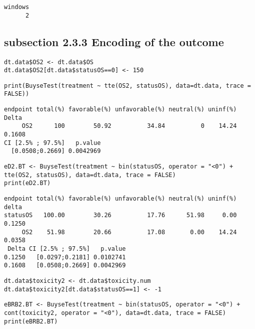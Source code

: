 \documentclass[12pt]{article}
\begin{document}
\begin{verbatim}
windows 
      2
\end{verbatim}

\subsection{subsection 2.3.3 Encoding of the outcome}
\label{sec:org54c6530}
\lstset{language=r,label= ,caption= ,captionpos=b,numbers=none}
\begin{lstlisting}
dt.data$OS2 <- dt.data$OS
dt.data$OS2[dt.data$statusOS==0] <- 150
\end{lstlisting}

\lstset{language=r,label= ,caption= ,captionpos=b,numbers=none}
\begin{lstlisting}
print(BuyseTest(treatment ~ tte(OS2, statusOS), data=dt.data, trace = FALSE))
\end{lstlisting}

\begin{verbatim}
endpoint total(%) favorable(%) unfavorable(%) neutral(%) uninf(%)  Delta
     OS2      100        50.92          34.84          0    14.24 0.1608
CI [2.5% ; 97.5%]   p.value
  [0.0508;0.2669] 0.0042969
\end{verbatim}



\lstset{language=r,label= ,caption= ,captionpos=b,numbers=none}
\begin{lstlisting}
eD2.BT <- BuyseTest(treatment ~ bin(statusOS, operator = "<0") + tte(OS2, statusOS), data=dt.data, trace = FALSE)
print(eD2.BT)
\end{lstlisting}

\begin{verbatim}
endpoint total(%) favorable(%) unfavorable(%) neutral(%) uninf(%)  delta
statusOS   100.00        30.26          17.76      51.98     0.00 0.1250
     OS2    51.98        20.66          17.08       0.00    14.24 0.0358
 Delta CI [2.5% ; 97.5%]   p.value
0.1250   [0.0297;0.2181] 0.0102741
0.1608   [0.0508;0.2669] 0.0042969
\end{verbatim}



\lstset{language=r,label= ,caption= ,captionpos=b,numbers=none}
\begin{lstlisting}
dt.data$toxicity2 <- dt.data$toxicity.num
dt.data$toxicity2[dt.data$statusOS==1] <- -1
\end{lstlisting}

\lstset{language=r,label= ,caption= ,captionpos=b,numbers=none}
\begin{lstlisting}
eBRB2.BT <- BuyseTest(treatment ~ bin(statusOS, operator = "<0") + cont(toxicity2, operator = "<0"), data=dt.data, trace = FALSE)
print(eBRB2.BT)
\end{lstlisting}
\end{document}
